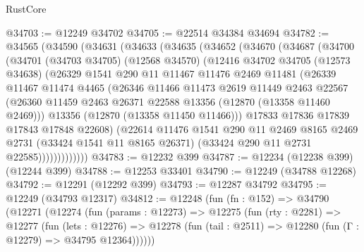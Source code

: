 \begin{lexlean}{RustCore}
\begin{coremodule}
@34703 := @12249 @34702
@34705 := @22514 @34384 @34694
@34782 := @34565
    (@34590
      (@34631
        (@34633
          (@34635
            (@34652
              (@34670
                (@34687
                  (@34700
                    (@34701
                      (@34703 @34705)
                      (@12568 @34570)
                      (@12416
                        @34702
                        @34705
                        (@12573 @34638)
                        (@26329
                          @1541
                          @290
                          @11
                          @11467
                          @11476
                          @2469
                          @11481
                          (@26339
                            @11467
                            @11474
                            @4465
                            (@26346
                              @11466
                              @11473
                              @2619
                              @11449
                              @2463
                              @22567
                              (@26360
                                @11459
                                @2463
                                @26371
                                @22588
                                @13356
                                (@12870 (@13358 @11460 @2469)))
                              @13356
                              (@12870 (@13358 @11450 @11466)))
                            @17833
                            @17836
                            @17839
                            @17843
                            @17848
                            @22608)
                          (@22614
                            @11476
                            @1541
                            @290
                            @11
                            @2469
                            @8165
                            @2469
                            @2731
                            (@33424 @1541 @11 @8165 @26371)
                            (@33424 @290 @11 @2731 @22585)))))))))))))
@34783 := @12232 @399
@34787 := @12234 (@12238 @399) (@12244 @399)
@34788 := @12253 @33401
@34790 := @12249 (@34788 @12268)
@34792 := @12291 (@12292 @399)
@34793 := @12287 @34792
@34795 := @12249 (@34793 @12317)
@34812 := @12248
    (fun (fn : @152) =>
    @34790
      (@12271
        (@12274
          (fun (params : @12273) =>
          @12275
            (fun (rty : @2281) =>
            @12277
              (fun (lets : @12276) =>
              @12278 (fun (tail : @2511) => @12280 (fun (Γ : @12279) => @34795 @12364))))))

\end{coremodule}
\end{lexlean}
